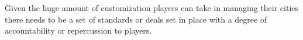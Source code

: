 


Given the huge amount of customization players can take in managing their cities there needs to be a set of standards or deals set in place with a degree of accountability or repercussion to players.  







